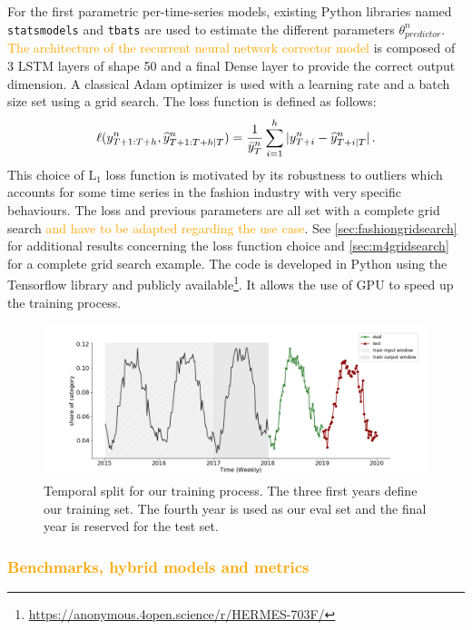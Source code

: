 \documentclass[10pt]{article} %
\newcommand{\ts}{y}
\newcommand{\tspred}{\widehat{\ts}}
\newcommand{\statparam}{\theta_{predictor}}
\newcommand{\lag}{h}
\newcommand{\meants}{\Bar{\ts}}
\begin{document}
For the first parametric per-time-series models, existing Python  libraries named \texttt{statsmodels} and  \texttt{tbats} are used to estimate the different parameters $\statparam^n$. \textcolor{orange}{The architecture of the recurrent neural network corrector model} is composed of 3 LSTM layers of shape 50 and a final Dense layer to provide the correct output dimension. A classical Adam optimizer is used with a learning rate and a batch size set using a grid search. The loss function is defined as follows:
$$
\ell(\ts^n_{T+1:T+\lag},\tspred^n_{T+1:T+\lag|T}) = \frac{1}{\meants^n_T}\sum_{i=1}^{\lag}|\ts^n_{T+i} - \tspred^n_{T+i|T}|\,.
$$
This choice of $\mathrm{L}_1$ loss function is motivated by its robustness to outliers which accounts for some time series in the fashion industry with very specific behaviours. The loss and previous parameters are all set with a complete grid search \textcolor{orange}{and have to be adapted regarding the use case}. See \ref{sec:fashiongridsearch} for additional results concerning the loss function choice and \ref{sec:m4gridsearch} for a complete grid search example. The code is developed in Python using the Tensorflow library and publicly available\footnote[1]{\url{https://anonymous.4open.science/r/HERMES-703F/}}. It allows the use of GPU to speed up the training process.



\begin{figure}
  \centering
    \includegraphics[width=1.\linewidth]{train_eval_test_set}
  \caption{Temporal split for our training process. The three first years define our training set. The fourth year is used as our eval set and the final year is reserved for the test set.}
\label{fig:train_eval_test_set}
\end{figure}

\textcolor{orange}{\subsubsection{Benchmarks, hybrid models and metrics}}
\label{sec:fashiontraining}
\end{document}
